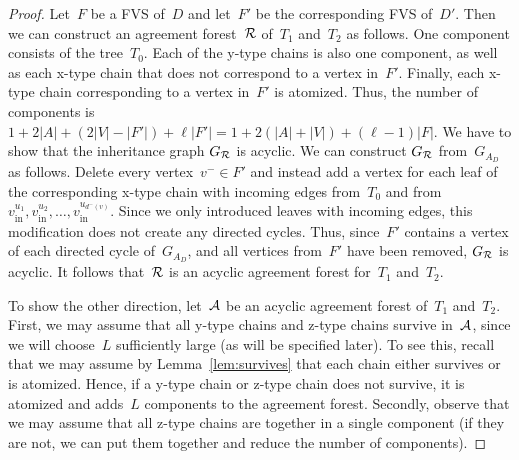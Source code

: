 \begin{proof}
Let~$F$ be a FVS of~$D$ and let~$F'$ be the corresponding FVS of~$D'$. Then we can construct an agreement forest~${\mathcal R}$ of~$T_1$ and~$T_2$ as follows. One component consists of the tree~$T_0$. Each of the y-type chains is also one component, as well as each x-type chain that does not correspond to a vertex in~$F' $. Finally, each x-type chain corresponding to a vertex in~$F'$ is atomized. Thus, the number of components is $1+2|A|+(2|V|-|F'|)+\ell|F'| = 1+2(|A|+|V|)+(\ell-1)|F|$. We have to show that the inheritance graph $G_{\mathcal R}$ is acyclic. We can construct $G_{\mathcal R}$ from~$G_{A_D}$ as follows. Delete every vertex~$v^-\in F'$ and instead add a vertex for each leaf of the corresponding x-type chain with incoming edges from~$T_0$ and from $v_{\text{in}}^{u_1},v_{\text{in}}^{u_2},\ldots,v_{\text{in}}^{u_{d^-(v)}}$. Since we only introduced leaves with incoming edges, this modification does not create any directed cycles. Thus, since~$F'$ contains a vertex of each directed cycle of~$G_{A_D}$, 
and all vertices from~$F'$ have been removed, $G_{\mathcal R}$ is acyclic. It follows that~${\mathcal R}$ is an acyclic agreement forest for~$T_1$ and~$T_2$.

To show the other direction, let~${\mathcal A}$ be an acyclic agreement forest of~$T_1$ and~$T_2$. First, we may assume that all y-type chains and z-type chains survive in~${\mathcal A}$, since we will choose~$L$ sufficiently large (as will be specified later). To see this, recall that we may assume by Lemma~\ref{lem:survives} that each chain either survives or is atomized. Hence, if a y-type chain or z-type chain does not survive, it is atomized and adds~$L$ components to the agreement forest. Secondly,  observe that we may assume that all z-type chains are together in a single component (if they are not, we can put them together and reduce the number of components). 


\end{proof}
